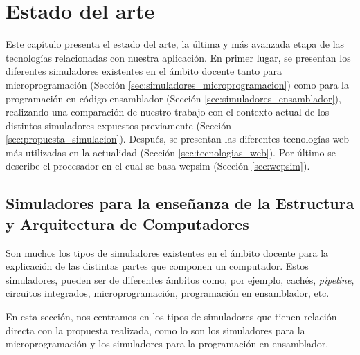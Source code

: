 \chead[]{}
\renewcommand{\headrulewidth}{0.5pt}

\lfoot[]{}
\cfoot[]{}
\rfoot[]{}
\renewcommand{\footrulewidth}{0pt}

\chapter{Estado del arte}
\label{ch:state_of_the_art}

Este capítulo presenta el estado del arte, la última y más avanzada etapa de las tecnologías relacionadas con nuestra aplicación. En primer lugar, se presentan los diferentes simuladores existentes en el ámbito docente tanto para microprogramación (Sección \ref{sec:simuladores_microprogramacion}) como para la programación en código \gls{ensamblador} (Sección \ref{sec:simuladores_ensamblador}), realizando una comparación de nuestro trabajo con el contexto actual de los distintos simuladores expuestos previamente (Sección \ref{sec:propuesta_simulacion}). Después, se presentan las diferentes tecnologías web más utilizadas en la actualidad (Sección \ref{sec:tecnologias_web}). Por último se describe el procesador en el cual se basa \acrshort{wepsim} (Sección \ref{sec:wepsim}).

\section{Simuladores para la enseñanza de la Estructura y Arquitectura de Computadores}

Son muchos los tipos de simuladores existentes en el ámbito docente para la explicación de las distintas partes que componen un computador. Estos simuladores, pueden ser de diferentes ámbitos como, por ejemplo, cachés, \emph{\gls{pipeline}}, circuitos integrados, microprogramación, programación en \gls{ensamblador}, etc.

En esta sección, nos centramos en los tipos de simuladores que tienen relación directa con la propuesta realizada, como lo son los simuladores para la microprogramación y los simuladores para la programación en \gls{ensamblador}.

